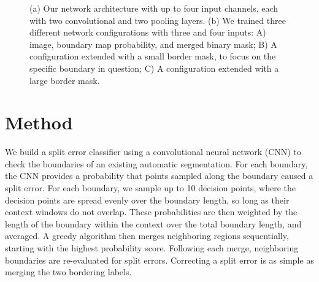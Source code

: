 \begin{figure}[t]
 \centering
    \hfill
	\caption{(a) Our network architecture with up to four input channels, each with two convolutional and two pooling layers. (b) We trained three different network configurations with three and four inputs: A) image, boundary map probability, and merged binary mask; B) A configuration extended with a small border mask, to focus on the specific boundary in question; C) A configuration extended with a large border mask.}
	\vspace{-0.4cm}
\end{figure}

\section{Method}
We build a split error classifier using a convolutional neural network (CNN) to check the boundaries of an existing automatic segmentation. For each boundary, the CNN provides a probability that points sampled along the boundary caused a split error. For each boundary, we sample up to 10 decision points, where the decision points are spread evenly over the boundary length, so long as their context windows do not overlap. These probabilities are then weighted by the length of the boundary within the context over the total boundary length, and averaged. A greedy algorithm then merges neighboring regions sequentially, starting with the highest probability score. Following each merge, neighboring boundaries are re-evaluated for split errors. Correcting a split error is as simple as merging the two bordering labels.

